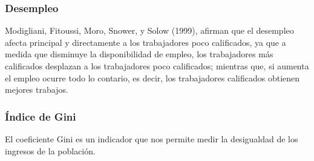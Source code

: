   \subsubsection{Desempleo}
  
  Modigliani, Fitoussi, Moro, Snower, y Solow (1999), afirman que el desempleo afecta principal y directamente a los trabajadores poco calificados, ya que a medida que disminuye la disponibilidad de empleo, los trabajadores más calificados desplazan a los trabajadores poco calificados; mientras que, si aumenta el empleo ocurre todo lo contario, es decir, los trabajadores calificados obtienen mejores trabajos.
  
  \subsubsection{Índice de Gini}
  
  El coeficiente Gini es un indicador que nos permite medir la desigualdad de los ingresos de la población.
  		

